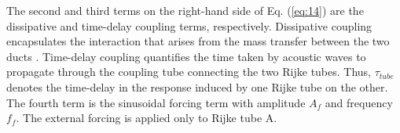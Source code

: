\documentclass[%
 aps,
 amsmath,amssymb,
preprint,%
superscriptaddress,
]{revtex4-2}
\begin{document}
The second and third terms on the right-hand side of Eq. (\ref{eq:14}) are the dissipative and time-delay coupling terms, respectively. Dissipative coupling encapsulates the interaction that arises from the mass transfer between the two ducts \cite{bar1985stability}. Time-delay coupling quantifies the time taken by acoustic waves to propagate through the coupling tube connecting the two Rijke tubes. Thus, $\tau_{tube}$ denotes the time-delay in the response induced by one Rijke tube on the other. The fourth term is the sinusoidal forcing term with amplitude $A_f$ and frequency $f_f$. The external forcing is applied only to Rijke tube A. 





\end{document}

